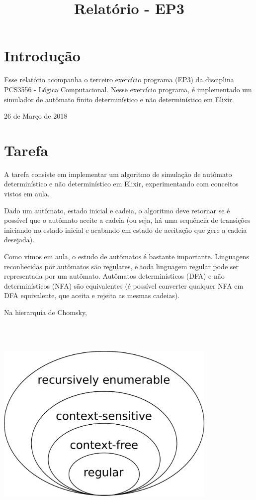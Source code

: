 \documentclass[conference]{IEEEtran}
\begin{document}
\title{Relatório - EP3}

\author{
}

\maketitle

\section{Introdução}
Esse relatório acompanha o terceiro exercício programa (EP3) da disciplina PCS3556 - Lógica Computacional. Nesse exercício programa, é implementado um simulador de autômato finito determinístico e não determinístico em Elixir.

\hfill 26 de Março de 2018

\section{Tarefa}

A tarefa consiste em implementar um algoritmo de simulação de autômato determinístico e não determinístico em Elixir, experimentando com conceitos vistos em aula.

Dado um autômato, estado inicial e cadeia, o algoritmo deve retornar se é possível que o autômato aceite a cadeia (ou seja, há uma sequência de transições iniciando no estado inicial e acabando em estado de aceitação que gere a cadeia desejada).

Como vimos em aula, o estudo de autômatos é bastante importante. Linguagens reconhecidas por autômatos são regulares, e toda linguagem regular pode ser representada por um autômato. Autômatos determinísticos (DFA) e não determinísticos (NFA) são equivalentes (é possível converter qualquer NFA em DFA equivalente, que aceita e rejeita as mesmas cadeias).

Na hierarquia de Chomsky,

\\
\\
\begin{minipage}{\linewidth}
    \centering
    \label{chomsky}
    \includegraphics[width=0.8\textwidth]{Chomsky-hierarchy.pdf}
\end{minipage}
\end{document}
